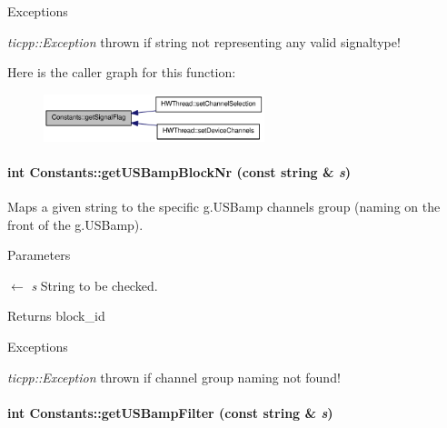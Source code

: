 \begin{DoxyExceptions}{Exceptions}
\item[{\em ticpp::Exception}]thrown if string not representing any valid signaltype! \end{DoxyExceptions}


Here is the caller graph for this function:\nopagebreak
\begin{figure}[H]
\begin{center}
\leavevmode
\includegraphics[width=182pt]{class_constants_a381d9729953ee019bca64e42d89005e7_icgraph}
\end{center}
\end{figure}
\hypertarget{class_constants_a1ee954b32810ee811d0f43994c5ca35e}{
\paragraph[{getUSBampBlockNr}]{\setlength{\rightskip}{0pt plus 5cm}int Constants::getUSBampBlockNr (const string \& {\em s})}\hfill}
\label{class_constants_a1ee954b32810ee811d0f43994c5ca35e}


Maps a given string to the specific g.USBamp channels group (naming on the front of the g.USBamp). 
\begin{DoxyParams}{Parameters}
\item[\mbox{$\leftarrow$} {\em s}]String to be checked. \end{DoxyParams}
\begin{DoxyReturn}{Returns}
block\_\-id 
\end{DoxyReturn}

\begin{DoxyExceptions}{Exceptions}
\item[{\em ticpp::Exception}]thrown if channel group naming not found! \end{DoxyExceptions}
\hypertarget{class_constants_a7f9f72585321601ca88ed86ccebdac9f}{
\paragraph[{getUSBampFilter}]{\setlength{\rightskip}{0pt plus 5cm}int Constants::getUSBampFilter (const string \& {\em s})}\hfill}
\label{class_constants_a7f9f72585321601ca88ed86ccebdac9f}


